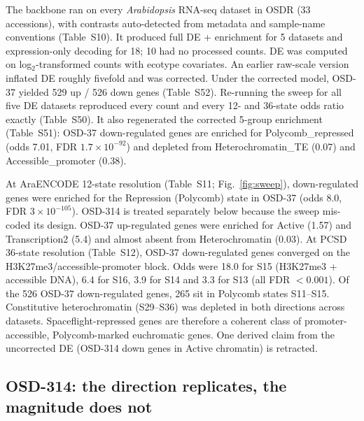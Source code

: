 \documentclass[11pt,a4paper]{article}
\newcommand{\Sx}[1]{Table~S#1}
\begin{document}
The backbone ran on every \textit{Arabidopsis} RNA-seq dataset in OSDR (33
accessions), with contrasts auto-detected from metadata and sample-name conventions
(\Sx{10}). It produced full DE + enrichment for 5 datasets and expression-only decoding
for 18; 10 had no processed counts. DE was computed on log$_2$-transformed counts with
ecotype covariates. An earlier raw-scale version inflated DE roughly fivefold and was
corrected. Under the corrected model, OSD-37 \citep{choi2019variation} yielded 529 up / 526 down genes
(\Sx{52}). Re-running the sweep for all five DE datasets reproduced every count and every
12- and 36-state odds ratio exactly (\Sx{50}). It also regenerated the corrected 5-group
enrichment (\Sx{51}): OSD-37 down-regulated genes are enriched for Polycomb\_repressed (odds 7.01, FDR
$1.7\times10^{-92}$) and depleted from Heterochromatin\_TE (0.07) and Accessible\_promoter (0.38).

At AraENCODE 12-state resolution (\Sx{11}; Fig.~\ref{fig:sweep}), down-regulated genes
were enriched for the Repression (Polycomb) state in OSD-37 (odds 8.0, FDR
$3\times10^{-105}$). OSD-314 \citep{villacampa2021mars} is treated separately below because the sweep mis-coded its
design. OSD-37 up-regulated genes
were enriched for Active (1.57) and Transcription2 (5.4) and almost absent from
Heterochromatin (0.03). At PCSD 36-state resolution (\Sx{12}), OSD-37 down-regulated
genes converged on the H3K27me3/accessible-promoter block. Odds were 18.0 for S15 (H3K27me3 + accessible DNA),
6.4 for S16, 3.9 for S14 and 3.3 for S13 (all FDR $<0.001$).
Of the 526 OSD-37 down-regulated genes, 265 sit in Polycomb states S11--S15.
Constitutive heterochromatin (S29--S36) was depleted in both directions across datasets.
Spaceflight-repressed genes are therefore a coherent class of promoter-accessible,
Polycomb-marked euchromatic genes. One derived claim from the uncorrected DE (OSD-314 down genes in Active chromatin) is
retracted.

\subsection{OSD-314: the direction replicates, the magnitude does not}
\end{document}
